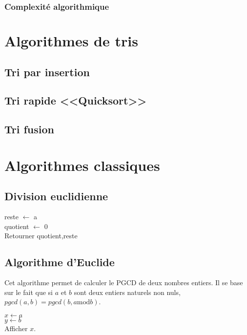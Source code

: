 \documentclass[10pt]{article}
\begin{document}
\subsubsection*{Complexité algorithmique}


\section{Algorithmes de tris}%
\subsection{Tri par insertion}
\subsection{Tri rapide <<Quicksort>>}
\subsection{Tri fusion}

\section{Algorithmes classiques}
\subsection{Division euclidienne}
\begin{pseudo}
\begin{algorithm}[H]
reste $\gets$ a\\
quotient $\gets$ 0\\
Retourner quotient,reste
\end{algorithm}
\end{pseudo}

\subsection{Algorithme d'Euclide}
Cet algorithme permet de calculer le PGCD de deux nombres entiers. Il se base sur le fait que si $a$ et $b$ sont deux entiers naturels non nuls, $pgcd(a,b)=pgcd(b, a \text{mod} b)$. 

\begin{pseudo}
\begin{algorithm}[H]
$x\gets a$\\
$y\gets b$\\
Afficher $x$.
\end{algorithm}
\end{pseudo}
\end{document}
